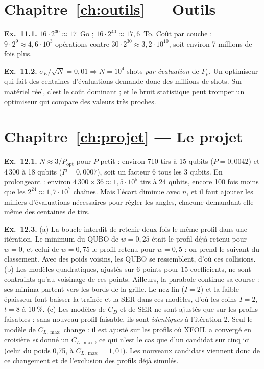 \section*{Chapitre~\ref{ch:outils} — Outils}
\textbf{Ex.~11.1.} $16\cdot2^{30}\approx17$~Go ; $16\cdot2^{40}\approx17{,}6$~To. Coût par couche : $9\cdot2^9\approx4{,}6\cdot10^3$ opérations contre $30\cdot2^{30}\approx3{,}2\cdot10^{10}$, soit environ 7 millions de fois plus.

\textbf{Ex.~11.2.} $\sigma_E/\sqrt N=0{,}01\Rightarrow N=10^4$ shots \emph{par évaluation} de $F_p$. Un optimiseur qui fait des centaines d'évaluations demande donc des millions de shots. Sur matériel réel, c'est le coût dominant ; et le bruit statistique peut tromper un optimiseur qui compare des valeurs très proches.

\section*{Chapitre~\ref{ch:projet} — Le projet}
\textbf{Ex.~12.1.} $N\approx3/P_{\text{opt}}$ pour $P$ petit : environ 710 tirs à 15 qubits ($P=0{,}0042$) et 4\,300 à 18 qubits ($P=0{,}0007$), soit un facteur 6 tous les 3 qubits. En prolongeant : environ $4\,300\times36\approx1{,}5\cdot10^5$ tirs à 24 qubits, encore 100 fois moins que les $2^{24}\approx1{,}7\cdot10^7$ chaînes. Mais l'écart diminue avec $n$, et il faut ajouter les milliers d'évaluations nécessaires pour régler les angles, chacune demandant elle-même des centaines de tirs.

\textbf{Ex.~12.3.} (a) La boucle interdit de retenir deux fois le même profil dans une itération. Le minimum du QUBO de $w=0{,}25$ était le profil déjà retenu pour $w=0$, et celui de $w=0{,}75$ le profil retenu pour $w=0{,}5$ : on prend le suivant du classement. Avec des poids voisins, les QUBO se ressemblent, d'où ces collisions. (b) Les modèles quadratiques, ajustés sur 6 points pour 15 coefficients, ne sont contraints qu'au voisinage de ces points. Ailleurs, la parabole continue sa course : ses minima partent vers les bords de la grille. Le nez fin ($I=2$) et la faible épaisseur font baisser la traînée et la SER dans ces modèles, d'où les coins $I=2$, $t=8$ à $10~\%$. (c) Les modèles de $C_D$ et de SER ne sont ajustés que sur les profils faisables : sans nouveau profil faisable, ils sont \emph{identiques} à l'itération 2. Seul le modèle de $C_{L,\max}$ change : il est ajusté sur les profils où XFOIL a convergé en croisière \emph{et} donné un $C_{L,\max}$, ce qui n'est le cas que d'un candidat sur cinq ici (celui du poids 0,75, à $C_{L,\max}=1{,}01$). Les nouveaux candidats viennent donc de ce changement et de l'exclusion des profils déjà simulés.

